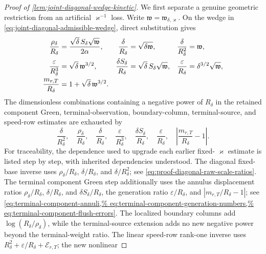 \begin{proof}[Proof of
\cref{lem:joint-diagonal-wedge-kinetic}]
We first separate a genuine geometric restriction from an artificial
\(\varkappa^{-1}\) loss.  Write
\(\mathfrak w=\mathfrak w_{\delta,\varkappa}\).  On the wedge in
\cref{eq:joint-diagonal-admissible-wedge}, direct substitution gives
\begin{align}
 \frac{\rho_\delta}{R_\delta}
 &=\frac{\sqrt\delta\,S_\delta\sqrt{\mathfrak w}}{2\alpha},&
 \frac{\delta}{R_\delta}&=\sqrt{\delta\mathfrak w},&
 \frac{\delta}{R_\delta^2}&=\mathfrak w,\notag\\
 \frac{\varepsilon}{R_\delta^3}
 &=\sqrt\delta\,\mathfrak w^{3/2},&
 \frac{\delta S_\delta}{R_\delta}
 &=\sqrt\delta\,S_\delta\sqrt{\mathfrak w},&
 \frac{\varepsilon}{R_\delta}
 &=\delta^{3/2}\sqrt{\mathfrak w},               \label{eq:proof-joint-wedge-ratios}\\
 \frac{m_{r,T}}{R_\delta}
 &=1+\sqrt\delta\,\mathfrak w^{3/2}.\notag
\end{align}
The dimensionless combinations containing a negative power of \(R_\delta\)
in the retained component Green, terminal-observation, boundary-column,
terminal-source, and speed-row estimates are exhausted by
\begin{equation}
 \frac{\delta}{R_\delta^2},\quad
 \frac{\rho_\delta}{R_\delta},\quad
 \frac{\delta}{R_\delta},\quad
 \frac{\varepsilon}{R_\delta^3},\quad
 \frac{\delta S_\delta}{R_\delta},\quad
 \frac{\varepsilon}{R_\delta},\quad
 \left|\frac{m_{r,T}}{R_\delta}-1\right|.        \label{eq:proof-joint-wedge-exhaustive-ratios}
\end{equation}
For traceability, the dependence used to upgrade each earlier fixed-
\(\varkappa\) estimate is listed step by step, with inherited dependencies
understood.  The diagonal fixed-base inverse uses
\(\rho_\delta/R_\delta\), \(\delta/R_\delta\), and
\(\delta/R_\delta^2\); see
\cref{eq:proof-diagonal-raw-scale-ratios}.  The terminal component Green
step additionally uses the annulus displacement ratios
\(\rho_\delta/R_\delta\), \(\delta/R_\delta\), and
\(\delta S_\delta/R_\delta\), the generation ratio
\(\varepsilon/R_\delta\), and
\(|m_{r,T}/R_\delta-1|\); see
\cref{eq:terminal-component-annuli,%
eq:terminal-component-generation-numbers,%
eq:terminal-component-flush-errors}.  The localized boundary columns add
\(\log(R_\delta/\rho_\delta)\), while the terminal-source extension adds no
new negative power beyond the terminal-weight ratio.  The linear speed-row
rank-one inverse uses
\(R_\delta^2+\varepsilon/R_\delta+\mathcal E_{r,T}\); the new nonlinear

\end{proof}
